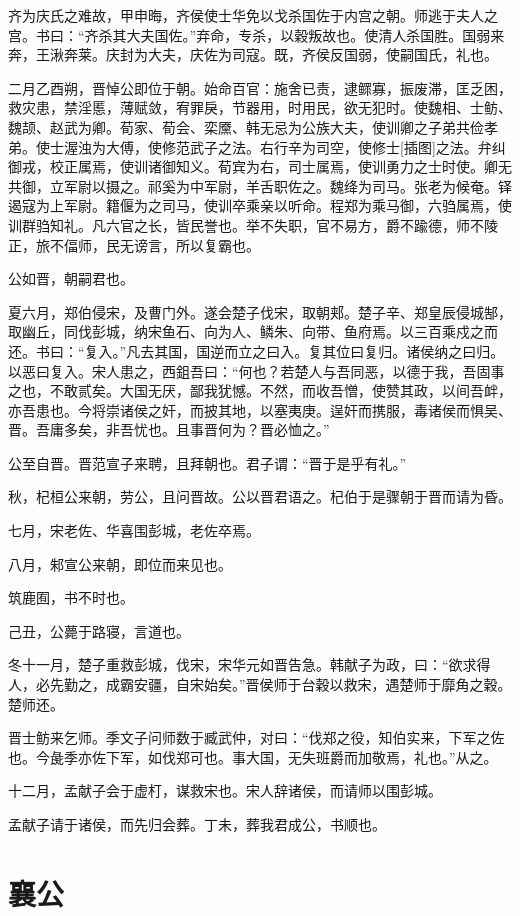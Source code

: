 \documentclass[a4paper,12pt,UTF8,twoside]{ctexbook}
\begin{document}
齐为庆氏之难故，甲申晦，齐侯使士华免以戈杀国佐于内宫之朝。师逃于夫人之宫。书曰：“齐杀其大夫国佐。”弃命，专杀，以穀叛故也。使清人杀国胜。国弱来奔，王湫奔莱。庆封为大夫，庆佐为司寇。既，齐侯反国弱，使嗣国氏，礼也。

二月乙酉朔，晋悼公即位于朝。始命百官：施舍已责，逮鳏寡，振废滞，匡乏困，救灾患，禁淫慝，薄赋敛，宥罪戾，节器用，时用民，欲无犯时。使魏相、士鲂、魏颉、赵武为卿。荀家、荀会、栾黡、韩无忌为公族大夫，使训卿之子弟共俭孝弟。使士渥浊为大傅，使修范武子之法。右行辛为司空，使修士[插图]之法。弁纠御戎，校正属焉，使训诸御知义。荀宾为右，司士属焉，使训勇力之士时使。卿无共御，立军尉以摄之。祁奚为中军尉，羊舌职佐之。魏绛为司马。张老为候奄。铎遏寇为上军尉。籍偃为之司马，使训卒乘亲以听命。程郑为乘马御，六驺属焉，使训群驺知礼。凡六官之长，皆民誉也。举不失职，官不易方，爵不踰德，师不陵正，旅不偪师，民无谤言，所以复霸也。

公如晋，朝嗣君也。

夏六月，郑伯侵宋，及曹门外。遂会楚子伐宋，取朝郏。楚子辛、郑皇辰侵城郜，取幽丘，同伐彭城，纳宋鱼石、向为人、鳞朱、向带、鱼府焉。以三百乘戍之而还。书曰：“复入。”凡去其国，国逆而立之曰入。复其位曰复归。诸侯纳之曰归。以恶曰复入。宋人患之，西鉏吾曰：“何也？若楚人与吾同恶，以德于我，吾固事之也，不敢贰矣。大国无厌，鄙我犹憾。不然，而收吾憎，使赞其政，以间吾衅，亦吾患也。今将崇诸侯之奸，而披其地，以塞夷庚。逞奸而携服，毒诸侯而惧吴、晋。吾庸多矣，非吾忧也。且事晋何为？晋必恤之。”

公至自晋。晋范宣子来聘，且拜朝也。君子谓：“晋于是乎有礼。”

秋，杞桓公来朝，劳公，且问晋故。公以晋君语之。杞伯于是骤朝于晋而请为昏。

七月，宋老佐、华喜围彭城，老佐卒焉。

八月，邾宣公来朝，即位而来见也。

筑鹿囿，书不时也。

己丑，公薨于路寝，言道也。

冬十一月，楚子重救彭城，伐宋，宋华元如晋告急。韩献子为政，曰：“欲求得人，必先勤之，成霸安疆，自宋始矣。”晋侯师于台穀以救宋，遇楚师于靡角之穀。楚师还。

晋士鲂来乞师。季文子问师数于臧武仲，对曰：“伐郑之役，知伯实来，下军之佐也。今彘季亦佐下军，如伐郑可也。事大国，无失班爵而加敬焉，礼也。”从之。

十二月，孟献子会于虚朾，谋救宋也。宋人辞诸侯，而请师以围彭城。

孟献子请于诸侯，而先归会葬。丁未，葬我君成公，书顺也。


\part{襄公}
\end{document}
